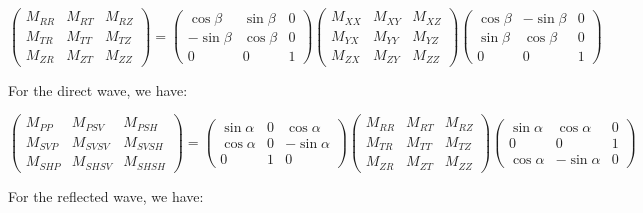 \documentclass[methods.tex]{subfiles}
\begin{document}
\begin{equation}
\begin{pmatrix}
M_{RR} & M_{RT} & M_{RZ} \\
M_{TR} & M_{TT} & M_{TZ} \\
M_{ZR} & M_{ZT} & M_{ZZ}
\end{pmatrix} = \begin{pmatrix}
\cos \beta & \sin \beta & 0 \\
- \sin \beta & \cos \beta & 0 \\
0 & 0 & 1
\end{pmatrix} \begin{pmatrix}
M_{XX} & M_{XY} & M_{XZ} \\
M_{YX} & M_{YY} & M_{YZ} \\
M_{ZX} & M_{ZY} & M_{ZZ}
\end{pmatrix} \begin{pmatrix}
\cos \beta & - \sin \beta & 0 \\
\sin \beta & \cos \beta & 0 \\
0 & 0 & 1
\end{pmatrix}
\end{equation}

For the direct wave, we have:

\begin{equation}
\begin{pmatrix}
M_{PP} & M_{PSV} & M_{PSH} \\
M_{SVP} & M_{SVSV} & M_{SVSH} \\
M_{SHP} & M_{SHSV} & M_{SHSH}
\end{pmatrix} = \begin{pmatrix}
\sin \alpha & 0 & \cos \alpha \\
\cos \alpha & 0 & - \sin \alpha \\
0 & 1 & 0
\end{pmatrix} \begin{pmatrix}
M_{RR} & M_{RT} & M_{RZ} \\
M_{TR} & M_{TT} & M_{TZ} \\
M_{ZR} & M_{ZT} & M_{ZZ}
\end{pmatrix} \begin{pmatrix}
\sin \alpha & \cos \alpha & 0 \\
0 & 0 & 1 \\
\cos \alpha & - \sin \alpha & 0
\end{pmatrix}
\end{equation}

For the reflected wave, we have:
\end{document}
